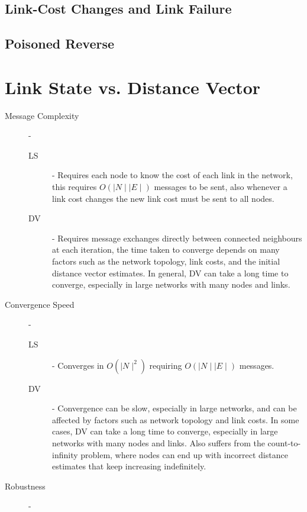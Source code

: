 \documentclass[12pt letter]{report}
\begin{document}
\subsection{Link-Cost Changes and Link Failure}

\subsection{Poisoned Reverse}

\section{Link State vs. Distance Vector}

\begin{description}
  \item[Message Complexity]  -
    \begin{description}
      \item[LS]  - Requires each node to know the cost of each link
        in the network, this requires $O \left(  \mid N \mid  \mid E
        \mid  \right) $ messages to be sent, also whenever a link
        cost changes the new link cost must be sent to all nodes.
      \item[DV] - Requires message exchanges directly between
        connected neighbours at each iteration, the time taken to
        converge depends on many factors such as the network
        topology, link costs, and the initial distance vector
        estimates. In general, DV can take a long time to converge,
        especially in large networks with many nodes and links.
    \end{description}
  \item[Convergence Speed]-
    \begin{description}
      \item[LS]  - Converges in $O \left(  \mid N \mid ^2 \right) $
        requiring $O \left(  \mid N \mid  \mid E \mid  \right) $ messages.
      \item[DV] - Convergence can be slow, especially in large
        networks, and can be affected by factors such as network
        topology and link costs. In some cases, DV can take a long
        time to converge, especially in large networks with many
        nodes and links. Also suffers from the count-to-infinity
        problem, where nodes can end up with incorrect distance
        estimates that keep increasing indefinitely.
    \end{description}
  \item[Robustness]-

\end{description}
\end{document}
